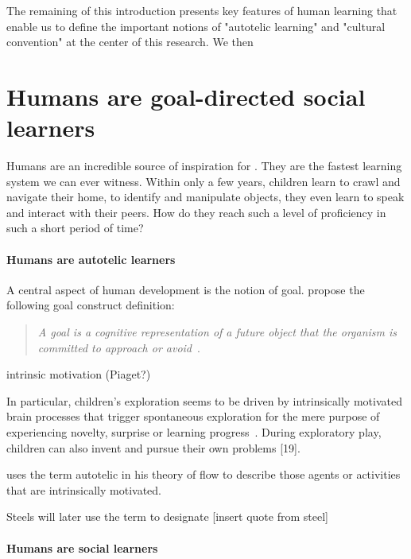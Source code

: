 The remaining of this introduction presents key features of human learning that enable us to define the important notions of "autotelic learning" and "cultural convention" at the center of this research. We then 	


\section{Humans are goal-directed social learners}

Humans are an incredible source of inspiration for \ai. They are the fastest learning system we can ever witness. Within only a few years, children learn to crawl and navigate their home, to identify and manipulate objects, they even learn to speak and interact with their peers. How do they reach such a level of proficiency in such a short period of time? 

\paragraph{Humans are autotelic learners}

A central aspect of human development is the notion of goal. \citet{elliot2008goal} propose the following goal construct definition:
\begin{quote}
    \textit{A goal is a cognitive representation of a future object that the organism is committed to approach or
    avoid}~\citep{elliot2008goal}.
\end{quote}


intrinsic motivation (Piaget?)

In particular, children's exploration seems to be driven by intrinsically motivated brain processes that trigger spontaneous exploration for the mere purpose of experiencing novelty, surprise or learning progress~\citep{gopnik1999scientist,kaplan2007search,kidd_psychology_2015}. During exploratory play, children can also invent and pursue their own problems [19].

\citet{csikzentmihalyi1997finding} uses the term autotelic in his theory of flow to describe those agents or activities that are intrinsically motivated. 

Steels will later use the term to designate [insert quote from steel]



\paragraph{Humans are social learners}

